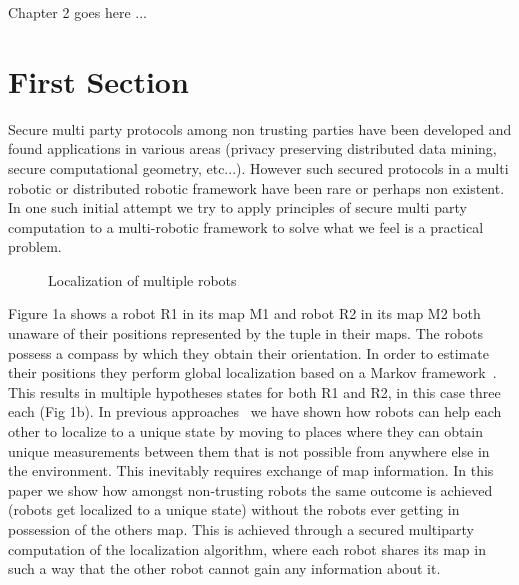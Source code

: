 
Chapter 2 goes here ...


\section{First Section} 
\label{sec:SECTION1NAME}

 
Secure multi party protocols among non trusting parties have been
developed and found applications in various areas (privacy preserving 
distributed data mining, secure computational geometry, etc...). However such
secured protocols in a multi robotic or distributed robotic framework have
been rare or perhaps non existent. In one such initial attempt we try to
apply principles of secure multi party computation to a multi-robotic
framework to solve what we feel is a practical problem.

\begin{figure}
\centering
{}
\hspace{10pt}
\caption{Localization of multiple robots}
\label{fig:1}
\vspace{-20pt}
\end{figure}


Figure 1a shows a robot R1 in its map M1 and robot R2 in its map M2 both
unaware of their positions represented by the tuple   in their maps. The
robots possess a compass by which they obtain their orientation. In order
to estimate their positions they perform global localization based on a
Markov framework~\cite{Fox98:M}. This results in multiple
hypotheses states for both R1 and R2, in this case three each (Fig 1b). In
previous approaches~\cite{BKG07,BK08} we have shown how robots can help each other
to localize to a unique state by moving to places where they can obtain
unique measurements between them that is not possible from anywhere else
in the environment. This inevitably requires exchange of map information.
In this paper we show how amongst non-trusting robots the same outcome is
achieved (robots get localized to a unique state) without the robots ever
getting in possession of the others map. This is achieved through a secured 
multiparty computation of the localization algorithm, where each robot shares 
its map in such a way that the other robot cannot gain any information about it.

